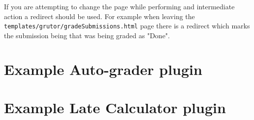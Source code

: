 \documentclass[11pt]{report}
\begin{document}
If you are attempting to change the page while performing and intermediate action a redirect 
should be used. For example when leaving the \texttt{templates/grutor/gradeSubmissions.html}
page there is a redirect which marks the submission being that was being graded as "Done".
\appendix
\chapter{Example Auto-grader plugin}
\label{ch:example_plugin}


\chapter{Example Late Calculator plugin}
\label{ch:example_late_plugin}

\end{document}
